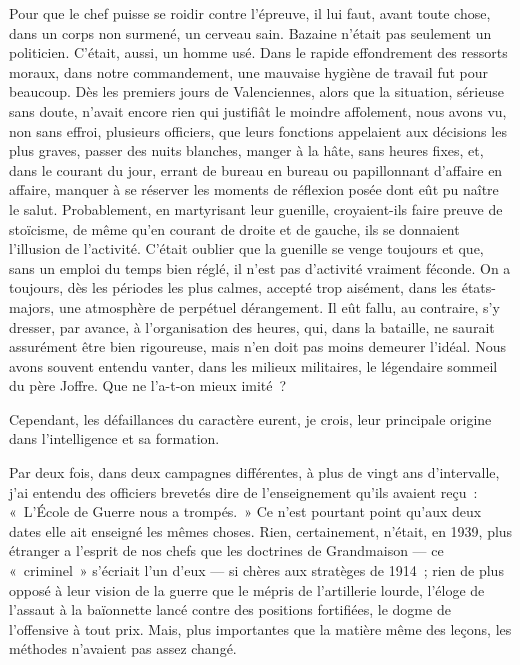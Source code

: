 \documentclass[french,twoside]{book} %
\begin{document}
\noindent Pour que le chef puisse se roidir contre l’épreuve, il lui faut, avant toute chose, dans un corps non surmené, un cerveau sain. Bazaine n’était pas seulement un politicien. C’était, aussi, un homme usé. Dans le rapide effondrement des ressorts moraux, dans notre commandement, une mauvaise hygiène de travail fut pour beaucoup. Dès les premiers jours de Valenciennes, alors que la situation, sérieuse sans doute, n’avait encore rien qui justifiât le moindre affolement, nous avons vu, non sans effroi, plusieurs officiers, que leurs fonctions appelaient aux décisions les plus graves, passer des nuits blanches, manger à la hâte, sans heures fixes, et, dans le   courant du jour, errant de bureau en bureau ou papillonnant d’affaire en affaire, manquer à se réserver les moments de réflexion posée dont eût pu naître le salut. Probablement, en martyrisant leur guenille, croyaient-ils faire preuve de stoïcisme, de même qu’en courant de droite et de gauche, ils se donnaient l’illusion de l’activité. C’était oublier que la guenille se venge toujours et que, sans un emploi du temps bien réglé, il n’est pas d’activité vraiment féconde. On a toujours, dès les périodes les plus calmes, accepté trop aisément, dans les états-majors, une atmosphère de perpétuel dérangement. Il eût fallu, au contraire, s’y dresser, par avance, à l’organisation des heures, qui, dans la bataille, ne saurait assurément être bien rigoureuse, mais n’en doit pas moins demeurer l’idéal. Nous avons souvent entendu vanter, dans les milieux militaires, le légendaire sommeil du père Joffre. Que ne l’a-t-on mieux imité ?\par
Cependant, les défaillances du caractère eurent, je crois, leur principale origine dans l’intelligence et sa formation.\par
Par deux fois, dans deux campagnes différentes, à plus de vingt ans d’intervalle, j’ai entendu des officiers brevetés dire de l’enseignement qu’ils avaient reçu : « L’École de Guerre nous a trompés. » Ce n’est pourtant point qu’aux deux dates elle ait enseigné les mêmes choses. Rien, certainement, n’était, en 1939, plus étranger a l’esprit de nos chefs que les doctrines de Grandmaison — ce « criminel » s’écriait l’un d’eux — si chères aux stratèges de 1914 ; rien de plus opposé à leur vision de la guerre que le mépris de l’artillerie lourde, l’éloge de l’assaut à la baïonnette lancé contre des positions fortifiées, le dogme de l’offensive à tout prix. Mais, plus importantes que la matière même des leçons, les méthodes n’avaient pas assez changé.\par
\end{document}
